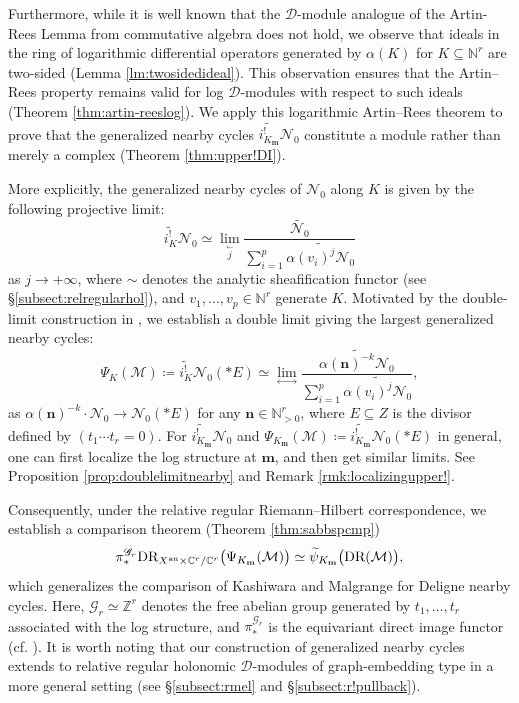 \documentclass{amsart}
\theoremstyle{plain}
\numberwithin{theorem}{section}
\theoremstyle{definition}
\theoremstyle{remark}
\theoremstyle{definition}
\newcommand{\wt}{\widetilde}
\newcommand{\be}{\begin{equation} }
\newcommand{\ee}{\end{equation} }
\newcommand{\C}{\mathbb{C}} %
\newcommand{\N}{\mathbb{N}}
\newcommand{\Z}{\mathbb{Z}}
\newcommand{\cM}{\mathcal{M}}
\newcommand{\cN}{\mathcal{N}}
\newcommand{\bn}{\mathbf{n}}
\newcommand{\bm}{\mathbf{m}}
\newcommand{\sG}{\mathscr{G}}
\newcommand{\shD}{\mathscr{D}}
\newcommand{\DR}{\textup{DR}}
\newcommand{\an}{\textup{an}}
\begin{document}
Furthermore, while it is well known that the $\shD$-module analogue of the Artin-Rees Lemma from commutative algebra does not hold, we observe that ideals in the ring of logarithmic differential operators generated by
$\alpha(K)$ for $K\subseteq \N^r$ are two-sided (Lemma \ref{lm:twosidedideal}). This observation ensures that the Artin–Rees property remains valid for log $\shD$-modules with respect to such ideals
(Theorem \ref{thm:artin-reeslog}). We apply this logarithmic Artin–Rees theorem to prove that the generalized 
nearby cycles $\wt{i^!_{K_\bm}}\cN_0$ constitute a module rather than merely a complex (Theorem \ref{thm:upper!DI}).

More explicitly, the generalized nearby cycles of $\cN_0$ along $K$ is given by the following projective limit:
\be\label{eq:eqlimprojmain}
\wt{i^!_{K}}\cN_0\simeq \lim_{\stackrel{\longleftarrow}{j} }\frac{\wt{\cN_0}}{\sum_{i=1}^p\wt{\alpha(v_i)^j\cN_0}}
\ee
as $j\to+\infty$, where $\sim$ denotes the analytic sheafification functor (see \S\ref{subsect:relregularhol}), and $v_1,\dots,v_p\in \N^r$ generate $K$. Motivated by the double-limit construction in \cite{Beiglue}, we establish a double limit giving the largest generalized nearby cycles:
\be\label{eq:doublelimtmain}
\Psi_{K}(\cM)\coloneqq \wt{i^!_{K}}\cN_0(*E)\simeq \lim_{\longleftrightarrow}\frac{\wt{\alpha(\bn)^{-k}\cN_0}}{\sum_{i=1}^p\wt{\alpha(v_i)^j\cN_0}}, 
\ee
as $\alpha(\bn)^{-k}\cdot\cN_0\to \cN_0(*E)$ for any $\bn\in \N_{>0}^r$, where $E\subseteq Z$ is the divisor defined by $(t_1\cdots t_r=0)$.
For $\wt{i^!_{K_\bm}}\cN_0$ and $\Psi_{K_\bm}(\cM)\coloneqq \wt{i^!_{K_\bm}}\cN_0(*E)$ in general, one can first localize the log structure at $\bm$, and then get similar limits. See Proposition \ref{prop:doublelimitnearby} and Remark \ref{rmk:localizingupper!}. 

Consequently, under the relative regular Riemann–Hilbert correspondence, we establish a comparison theorem (Theorem \ref{thm:sabbspcmp})
\be\label{eq:compmain}
\pi_*^{\sG_r}\DR_{X^\an\times\C^r/\C^r}\big(\Psi_{K_\bm}(\cM)\big)\simeq \wt{\psi}_{K_\bm}\big(\DR(\cM)\big),
\ee
which generalizes the comparison of Kashiwara \cite{KasV} and Malgrange \cite{MalV} for Deligne nearby cycles. Here, $\sG_r\simeq \Z^r$ denotes the free abelian group generated by $t_1,\dots, t_r$ associated with the log structure, and $\pi_*^{\sG_r}$ is the equivariant direct image functor (cf. \cite[Part I.0.3.]{BLequiv}). It is worth noting that our construction of generalized nearby cycles extends to relative regular holonomic $\shD$-modules of graph-embedding type in a more general setting (see \S\ref{subsect:rmel} and \S\ref{subsect:r!pullback}).
\end{document}
